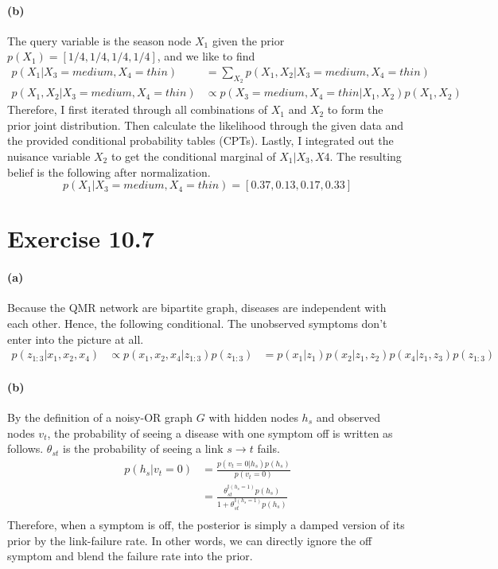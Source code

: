 \documentclass[11pt, letterpaper]{article}
\begin{document}
\paragraph{(b)}
The query variable is the season node $X_1$ given the prior $p(X_1) = [1/4, 1/4, 1/4, 1/4]$, and we like to find
\begin{align*}
    p(X_1|X_3 = medium, X_4 = thin) &= \sum_{X_2} p(X_1, X_2 | X_3 = medium, X_4 = thin) \\
    p(X_1, X_2 | X_3 = medium, X_4 = thin) &\propto p(X_3 = medium, X_4 = thin | X_1, X_2)p(X_1, X_2)
\end{align*}
Therefore, I first iterated through all combinations of $X_1$ and $X_2$ to form the prior joint distribution. Then calculate the likelihood through the given data and the provided conditional probability tables (CPTs). Lastly, I integrated out the nuisance variable $X_2$ to get the conditional marginal of $X_1|X_3, X4$. The resulting belief is the following after normalization.
\[
    p(X_1|X_3 = medium, X_4 = thin) = [0.37, 0.13, 0.17, 0.33]
\]

\section{Exercise 10.7}
\paragraph{(a)}
Because the QMR network are bipartite graph, diseases are independent with each other. Hence, the following conditional. The unobserved symptoms don't enter into the picture at all.
\begin{align*}
    p(z_{1:3}|x_1, x_2, x_4) &\propto p(x_1, x_2, x_4|z_{1:3})p(z_{1:3})
        &= p(x_1|z_1) p(x_2|z_1, z_2) p(x_4|z_1, z_3) p(z_{1:3})
\end{align*}

\paragraph{(b)}
By the definition of a noisy-OR graph $G$ with hidden nodes $h_s$ and observed nodes $v_t$, the probability of seeing a disease with one symptom off is written as follows. $\theta_{st}$ is the probability of seeing a link $s \rightarrow t$ fails.
\begin{align*}
    p(h_s|v_t=0) &= \frac{p(v_t=0|h_s) p(h_s)}{p(v_t=0)} \\
        &= \frac{\theta_{st}^{\mathbb{I}(h_s=1)} p(h_s)}{1 + \theta_{st}^{\mathbb{I}(h_s=1)} p(h_s)} \\
\end{align*}
Therefore, when a symptom is off, the posterior is simply a damped version of its prior by the link-failure rate. In other words, we can directly ignore the off symptom and blend the failure rate into the prior.
\end{document}

